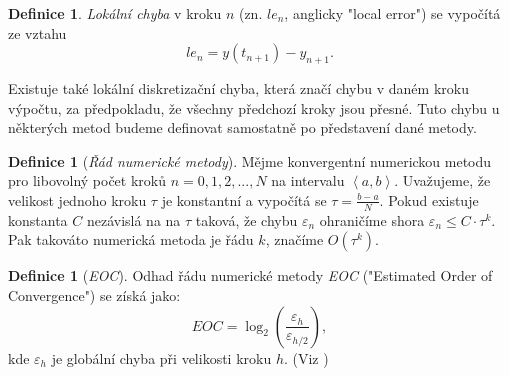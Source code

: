 \documentclass[a4paper,12pt,twoside]{article}
\theoremstyle{definition}
\newtheorem{defin}[veta]{Definice}
\theoremstyle{remark}
\numberwithin{equation}{section}
\numberwithin{table}{section}
\numberwithin{figure}{section}
\begin{document}

\begin{defin}
	\emph{Lokální chyba} v kroku $n$ (zn. $le_{n}$, anglicky "local error") se vypočítá ze vztahu
	$$le_{n} = y\left(t_{n+1}\right) - y_{n+1}.$$
\end{defin}

Existuje také lokální diskretizační chyba, která značí chybu v daném kroku výpočtu, za předpokladu, že všechny předchozí kroky jsou přesné. Tuto chybu u některých metod budeme definovat samostatně po představení dané metody.

\begin{defin} [\emph{Řád numerické metody}]
	Mějme konvergentní numerickou metodu pro libovolný počet kroků $n = 0,1,2, ..., N$ na intervalu $\left\langle a, b\right\rangle$. Uvažujeme, že velikost jednoho kroku $\tau$ je konstantní a vypočítá se $\tau = \frac{b-a}{N} $. Pokud existuje konstanta $C$ nezávislá na na $\tau$ taková, že chybu $\varepsilon_{n}$ ohraničíme shora $\varepsilon_{n} \leq C\cdot \tau^{k}$.
	Pak takováto numerická metoda je řádu $k$, značíme $O\left(\tau^{k}\right)$.
\end{defin}

\begin{defin} [\emph{EOC}] \label{EOC}
	Odhad řádu numerické metody \emph{EOC} ("Estimated Order of Convergence") se získá jako:
	$$EOC = \log_{2}\left( \frac{\varepsilon_{h}}{\varepsilon_{h/2}} \right),$$
	kde $\varepsilon_{h}$ je globální chyba při velikosti kroku $h$. (Viz \cite{Garrappa2})
\end{defin}
\end{document}
